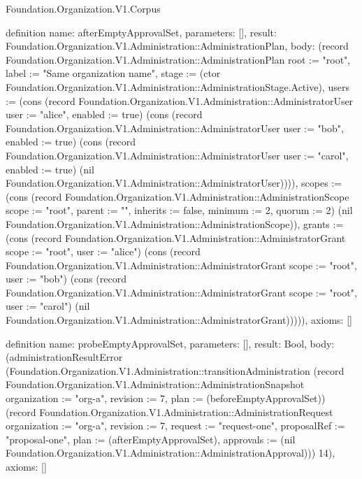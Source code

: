\begin{lexlean}{Foundation.Organization.V1.Corpus}
\begin{semanticmodule}
definition{
  name: afterEmptyApprovalSet,
  parameters: [],
  result: Foundation.Organization.V1.Administration::AdministrationPlan,
  body: (record Foundation.Organization.V1.Administration::AdministrationPlan {root := "root", label := "Same organization name", stage := (ctor Foundation.Organization.V1.Administration::AdministrationStage.Active), users := (cons (record Foundation.Organization.V1.Administration::AdministratorUser {user := "alice", enabled := true}) (cons (record Foundation.Organization.V1.Administration::AdministratorUser {user := "bob", enabled := true}) (cons (record Foundation.Organization.V1.Administration::AdministratorUser {user := "carol", enabled := true}) (nil Foundation.Organization.V1.Administration::AdministratorUser)))), scopes := (cons (record Foundation.Organization.V1.Administration::AdministrationScope {scope := "root", parent := "", inherits := false, minimum := 2, quorum := 2}) (nil Foundation.Organization.V1.Administration::AdministrationScope)), grants := (cons (record Foundation.Organization.V1.Administration::AdministratorGrant {scope := "root", user := "alice"}) (cons (record Foundation.Organization.V1.Administration::AdministratorGrant {scope := "root", user := "bob"}) (cons (record Foundation.Organization.V1.Administration::AdministratorGrant {scope := "root", user := "carol"}) (nil Foundation.Organization.V1.Administration::AdministratorGrant))))}),
  axioms: []
}

definition{
  name: probeEmptyApprovalSet,
  parameters: [],
  result: Bool,
  body: (administrationResultError (Foundation.Organization.V1.Administration::transitionAdministration (record Foundation.Organization.V1.Administration::AdministrationSnapshot {organization := "org-a", revision := 7, plan := (beforeEmptyApprovalSet)}) (record Foundation.Organization.V1.Administration::AdministrationRequest {organization := "org-a", revision := 7, request := "request-one", proposalRef := "proposal-one", plan := (afterEmptyApprovalSet), approvals := (nil Foundation.Organization.V1.Administration::AdministrationApproval)})) 14),
  axioms: []
}


\end{semanticmodule}
\end{lexlean}
